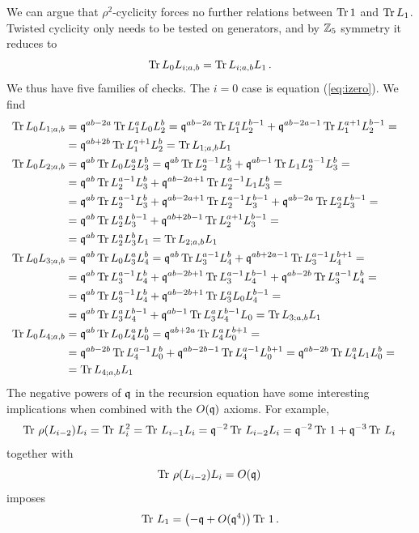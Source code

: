 \documentclass[12pt]{amsart}
\begin{document}
We can argue that $\rho^2$-cyclicity forces no further relations between $\operatorname{Tr} 1$ and $\operatorname{Tr} L_1$. Twisted cyclicity only needs to be tested on generators, and by $\mathbb{Z}_5$ symmetry it reduces to 
\begin{equation}
	\operatorname{Tr} L_0 L_{i;a,b} = \operatorname{Tr} L_{i;a,b} L_1 \, .
\end{equation}
We thus have five families of checks. The $i=0$ case is equation (\ref{eq:izero}). We find 
\begin{align}
	\operatorname{Tr} L_0 L_{1;a,b} &= \mathfrak{q}^{ab-2a} \operatorname{Tr} L_{1}^a L_0 L_2^b = \mathfrak{q}^{ab-2a} \operatorname{Tr} L_{1}^a L_2^{b-1}+ \mathfrak{q}^{ab-2a-1} \operatorname{Tr} L_{1}^{a+1} L_2^{b-1}= \cr &=\mathfrak{q}^{ab+2b} \operatorname{Tr} L_{1}^{a+1} L_2^{b} =  \operatorname{Tr} L_{1;a,b} L_1 \cr
	\operatorname{Tr} L_0 L_{2;a,b} &= \mathfrak{q}^{ab} \operatorname{Tr} L_0 L_{2}^a L_3^b =\mathfrak{q}^{ab} \operatorname{Tr} L_{2}^{a-1} L_3^b +\mathfrak{q}^{ab-1} \operatorname{Tr} L_1 L_{2}^{a-1} L_3^b 
	= \cr &=\mathfrak{q}^{ab} \operatorname{Tr} L_{2}^{a-1} L_3^b +\mathfrak{q}^{ab-2a+1} \operatorname{Tr} L_{2}^{a-1}  L_1 L_3^b= \cr 
	&=\mathfrak{q}^{ab} \operatorname{Tr} L_{2}^{a-1} L_3^b +\mathfrak{q}^{ab-2a+1} \operatorname{Tr} L_{2}^{a-1}  L_3^{b-1}+\mathfrak{q}^{ab-2a} \operatorname{Tr} L_{2}^{a} L_3^{b-1}  =\cr
	&=\mathfrak{q}^{ab} \operatorname{Tr} L_{2}^{a} L_3^{b-1} +\mathfrak{q}^{ab+2b-1} \operatorname{Tr} L_{2}^{a+1} L_3^{b-1} =\cr
	&=\mathfrak{q}^{ab} \operatorname{Tr} L_{2}^{a} L_3^{b}L_1 =  \operatorname{Tr} L_{2;a,b} L_1 \cr
	\operatorname{Tr} L_0 L_{3;a,b} &= \mathfrak{q}^{ab} \operatorname{Tr} L_0 L_{3}^a L_4^b = \mathfrak{q}^{ab} \operatorname{Tr} L_{3}^{a-1} L_4^b + \mathfrak{q}^{ab+2a-1} \operatorname{Tr} L_{3}^{a-1} L_4^{b+1} = \cr &= \mathfrak{q}^{ab} \operatorname{Tr} L_{3}^{a-1} L_4^b + \mathfrak{q}^{ab-2b+1} \operatorname{Tr} L_{3}^{a-1} L_4^{b-1}+ \mathfrak{q}^{ab-2b} \operatorname{Tr} L_{3}^{a-1} L_4^{b} = \cr
	&= \mathfrak{q}^{ab} \operatorname{Tr} L_{3}^{a-1} L_4^b + \mathfrak{q}^{ab-2b+1} \operatorname{Tr} L_{3}^{a} L_0 L_4^{b-1} =\cr 
	&= \mathfrak{q}^{ab} \operatorname{Tr} L_{3}^{a} L_4^{b-1} + \mathfrak{q}^{ab-1} \operatorname{Tr} L_{3}^{a}  L_4^{b-1} L_0 =  \operatorname{Tr} L_{3;a,b} L_1 \cr
	\operatorname{Tr} L_0 L_{4;a,b} &= \mathfrak{q}^{ab} \operatorname{Tr} L_0 L_{4}^a L_0^b = \mathfrak{q}^{ab+2a } \operatorname{Tr} L_{4}^a L_0^{b+1} = \cr
	 &= \mathfrak{q}^{ab-2b } \operatorname{Tr} L_{4}^{a-1} L_0^{b}+ \mathfrak{q}^{ab-2b-1 } \operatorname{Tr} L_{4}^{a-1} L_0^{b+1}= \mathfrak{q}^{ab-2b } \operatorname{Tr} L_{4}^{a} L_1 L_0^{b}= \cr &=\operatorname{Tr} L_{4;a,b} L_1
\end{align}
The negative powers of $\mathfrak{q}$ in the recursion equation have some interesting implications when combined with the $O(\mathfrak{q})$ axioms. 
For example,
\begin{equation}
	\operatorname{Tr} \, \rho(L_{i-2}) L_i = \operatorname{Tr} \, L_i^2 = \operatorname{Tr} \,L_{i-1} L_i =  \mathfrak{q}^{-2} \operatorname{Tr} \,L_{i-2} L_i =  \mathfrak{q}^{-2} \operatorname{Tr}\, 1+ \mathfrak{q}^{-3} \operatorname{Tr} \,L_{i} \,
\end{equation}
together with 
\begin{equation}
	\operatorname{Tr} \, \rho(L_{i-2}) L_i  = O(\mathfrak{q}) \,
\end{equation} 
imposes
\begin{equation}
	\operatorname{Tr} \,L_1 = \left(- \mathfrak{q} + O(\mathfrak{q}^4) \right) \operatorname{Tr} \,1\, .
\end{equation} 
\end{document}
